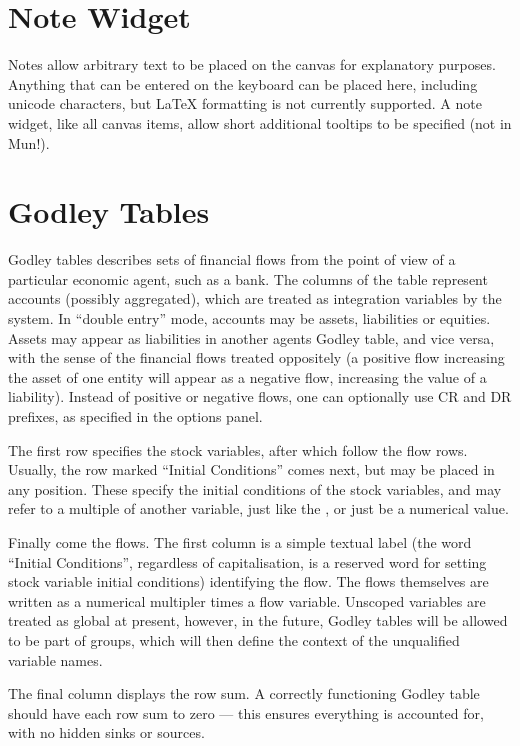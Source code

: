 \section{Note Widget}
 \label{Notes} Notes allow arbitrary text to be
placed on the canvas for explanatory purposes. Anything that can be
entered on the keyboard can be placed here, including unicode
characters, but LaTeX formatting is not currently supported. A note
widget, like all canvas items, allow short additional tooltips to be
specified (not in Mun!). 

\section{Godley Tables}\label{godley}

Godley tables describes sets of financial flows from the point of view
of a particular economic agent, such as a bank. The columns of the
table represent accounts (possibly aggregated), which are treated as
integration variables by the system. In ``double entry'' mode,
accounts may be assets, liabilities or equities. Assets may appear as
liabilities in another agents Godley table, and vice versa, with the
sense of the financial flows treated oppositely (a positive flow increasing the
asset of one entity will appear as a negative flow, increasing the
value of a liability). Instead of positive or negative flows, one can
optionally use CR and DR prefixes, as specified in the options panel.

The first row specifies the stock variables, after which follow the
flow rows. Usually, the row marked ``Initial Conditions'' comes next,
but may be placed in any position. These specify the initial
conditions of the stock variables, and may refer to a multiple of
another variable, just like the , or just be a numerical value.

Finally come the flows. The first column is a simple textual label
(the word ``Initial Conditions'', regardless of capitalisation, is a
reserved word for setting stock variable initial conditions)
identifying the flow. The flows themselves are written as a numerical
multipler times a flow variable. Unscoped variables are treated as
global at present, however, in the future, Godley tables will be
allowed to be part of groups, which will then define the context of
the unqualified variable names.

The final column displays the row sum. A correctly functioning Godley
table should have each row sum to zero --- this ensures everything is
accounted for, with no hidden sinks or sources.

